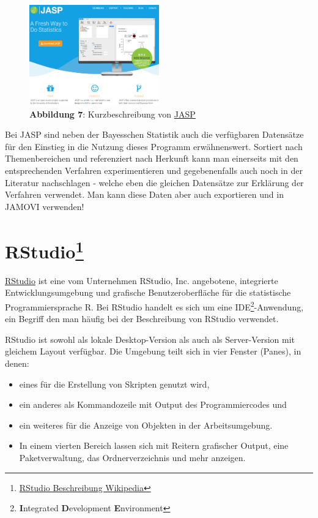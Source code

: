 \documentclass[]{article}
\providecommand{\tightlist}{%
  \setlength{\itemsep}{0pt}\setlength{\parskip}{0pt}}
\let\rmarkdownfootnote\footnote%
\def\footnote{\protect\rmarkdownfootnote}
\begin{document}
\begin{figure}
\centering
\includegraphics[width=0.50000\textwidth]{Images/JASP.PNG}
\caption{\textbf{Abbildung 7}: Kurzbeschreibung von
\href{https://jasp-stats.org/}{JASP}}
\end{figure}

Bei JASP sind neben der Bayesschen Statistik auch die verfügbaren
Datensätze für den Einstieg in die Nutzung dieses Programm
erwähnenswert. Sortiert nach Themenbereichen und referenziert nach
Herkunft kann man einerseits mit den entsprechenden Verfahren
experimentieren und gegebenenfalls auch noch in der Literatur
nachschlagen - welche eben die gleichen Datensätze zur Erklärung der
Verfahren verwendet. Man kann diese Daten aber auch exportieren und in
JAMOVI verwenden!

\section[\textbf{R}Studio]{\texorpdfstring{\textbf{R}Studio\footnote{\href{https://de.wikipedia.org/wiki/RStudio}{RStudio
  Beschreibung Wikipedia}}}{RStudio}}\label{rstudio5}

\href{https://www.rstudio.com/}{RStudio} ist eine vom Unternehmen
RStudio, Inc. angebotene, integrierte Entwicklungsumgebung und grafische
Benutzeroberfläche für die statistische Programmiersprache R. Bei
RStudio handelt es sich um eine IDE\footnote{\textbf{I}ntegrated
  \textbf{D}evelopment \textbf{E}nvironment}-Anwendung, ein Begriff den
man häufig bei der Beschreibung von RStudio verwendet.

RStudio ist sowohl als lokale Desktop-Version als auch als
Server-Version mit gleichem Layout verfügbar. Die Umgebung teilt sich in
vier Fenster (Panes), in denen:

\begin{itemize}
\tightlist
\item
  eines für die Erstellung von Skripten genutzt wird,
\item
  ein anderes als Kommandozeile mit Output des Programmiercodes und
\item
  ein weiteres für die Anzeige von Objekten in der Arbeitsumgebung.
\item
  In einem vierten Bereich lassen sich mit Reitern grafischer Output,
  eine Paketverwaltung, das Ordnerverzeichnis und mehr anzeigen.
\end{itemize}
\end{document}
